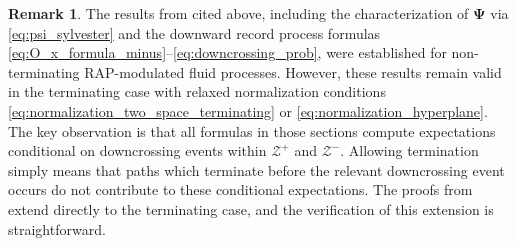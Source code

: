 \documentclass[a4paper,11pt]{article}
\numberwithin{equation}{section}
\theoremstyle{plain}
\theoremstyle{definition}
\newtheorem{remark}[theorem]{Remark}
\newcommand{\1}{\mathbf{1}}
\begin{document}
\begin{remark}\label{rem:terminating_raps}
The results from \cite[Sections 4.1 and 4.2]{BeanNguyenNielsenPeralta2022} cited above, including the characterization of $\bm{\Psi}$ via \eqref{eq:psi_sylvester} and the downward record process formulas \eqref{eq:O_x_formula_minus}--\eqref{eq:downcrossing_prob}, were established for non-terminating RAP-modulated fluid processes. However, these results remain valid in the terminating case with relaxed normalization conditions \eqref{eq:normalization_two_space_terminating} or \eqref{eq:normalization_hyperplane}. The key observation is that all formulas in those sections compute expectations conditional on downcrossing events within $\mathcal{Z}^+$ and $\mathcal{Z}^-$. Allowing termination simply means that paths which terminate before the relevant downcrossing event occurs do not contribute to these conditional expectations. The proofs from \cite{BeanNguyenNielsenPeralta2022} extend directly to the terminating case, and the verification of this extension is straightforward.
\end{remark}
\end{document}
